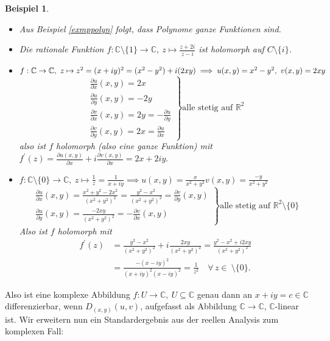 \documentclass[a4paper,12pt]{book}
\theoremstyle{newthm}
\theoremstyle{newdef}
\theoremstyle{newrem}
\newtheorem{exmp}[thm]{Beispiel}
\newcommand{\R}{\mathbb{R}}
\newcommand{\C}{\mathbb{C}}
\newcommand{\del}{\partial}
\begin{document}
		\begin{exmp}
			\begin{itemize}
				\item Aus Beispiel \ref{exmppolyn} folgt, dass Polynome ganze Funktionen sind.				
				\item Die rationale Funktion $ f: \C\setminus \{1\} \to \C,\ z \mapsto \frac{z+2i}{z-i} $ ist holomorph auf $ C \setminus \{i\} $.
				\item $ f: \C \to \C,\ z \mapsto z^2 = (x+iy)^2 = (x^2-y^2)+i(2xy) \\
				\implies u(x,y) = x^2-y^2,\ v(x,y) = 2xy $
				\[
				\left.\begin{array}{ll}
					\frac{\del u}{\del x}(x,y) = 2x\\
					\frac{\del u}{\del y}(x,y) = -2y\\
					\frac{\del v}{\del x}(x,y) = 2y = -\frac{\del u}{\del y}\\
					\frac{\del v}{\del y}(x,y) = 2x = \frac{\del u}{\del x}
				\end{array} \right\} \text{alle stetig auf }\R^2
				\]
				also ist $f$ holomorph (also eine ganze Funktion) mit $ f^\prime(z) = \frac{\del u(x,y)}{\del x} + i\frac{\del v(x,y)}{\del x} = 2x + 2iy. $				
				\item $ f: \C\setminus\{0\} \to \C,\ z \mapsto \frac{1}{z} = \frac{1}{x+iy} \implies u(x,y) = \frac{x}{x^2 + y^2} v(x,y) = \frac{-y}{x^2 + y^2} $
				\[
				\left.\begin{array}{ll}
				\frac{\del u}{\del x}(x,y) = \frac{x^2+y^2-2x^2}{(x^2+y^2)^2} = \frac{y^2-x^2}{(x^2+y^2)^2} = \frac{\del v}{\del y}(x,y)\\
				\frac{\del u}{\del y}(x,y) = \frac{-2xy}{(x^2+y^2)^2} = -\frac{\del v}{\del x}(x,y)
				\end{array} \right\} \text{alle stetig auf }\R^2\setminus\{0\}
				\]
				Also ist $f$ holomorph mit 
				\begin{align*}
					f^\prime(z) &= \frac{y^2-x^2}{(x^2+y^2)^2} + i\frac{2xy}{(x^2+y^2)^2} = \frac{y^2-x^2 + i2xy}{(x^2+y^2)^2}\\
					&= \frac{-(x-iy)^2}{(x+iy)^2(x-iy)^2} = \frac{1}{z^2}\quad \forall\, z \in \ \setminus\{0\}. 
				\end{align*}
			\end{itemize}
		\end{exmp}
		
		Also ist eine komplexe Abbildung $ f: U \to \C,\ U \subseteq \C $ genau dann an $ x+iy = c \in \C $ differenzierbar, wenn $ D_{(x,y)}(u,v) $, aufgefasst als Abbildung $ \C \to \C $, $\C$-linear ist. Wir erweitern nun ein Standardergebnis aus der reellen Analysis zum komplexen Fall:
		
\end{document}
